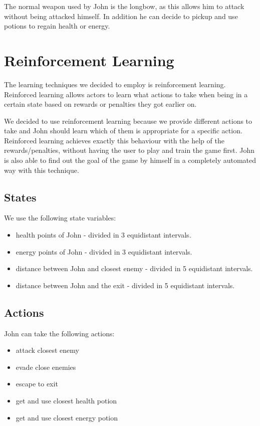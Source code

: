 \documentclass[a4paper,10pt]{scrartcl}
\begin{document}
The normal weapon used by John is the longbow, as this allows him to attack without being attacked himself. In addition he can decide to pickup and use potions to regain health or energy.

\section{Reinforcement Learning}\label{sec:rl}
The learning techniques we decided to employ is reinforcement learning. Reinforced learning allows actors to learn what actions to take when being in a certain state based on rewards or penalties they got earlier on.

We decided to use reinforcement learning because we provide different actions to take and John should learn which of them is appropriate for a specific action. Reinforced learning achieves exactly this behaviour with the help of the rewards/penalties, without having the user to play and train the game first. John is also able to find out the goal of the game by himself in a completely automated way with this technique. 

\subsection{States}
We use the following state variables:
\begin{itemize}
 \item health points of John - divided in 3 equidistant intervals.
 \item energy points of John - divided in 3 equidistant intervals.
 \item distance between John and closest enemy  - divided in 5 equidistant intervals.
 \item distance between John and the exit - divided in 5 equidistant intervals.
\end{itemize}

\subsection{Actions}
John can take the following actions:
\begin{itemize}
 \item attack closest enemy
 \item evade close enemies
 \item escape to exit
 \item get and use closest health potion
 \item get and use closest energy potion
\end{itemize}
\end{document}
